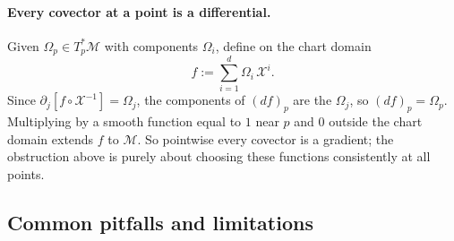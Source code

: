 \documentclass[11pt]{article}
\newcommand{\TpsM}{T_p^*\mathcal M}
\begin{document}
\paragraph{Every covector at a point is a differential.} Given $\Omega_p\in\TpsM$ with components $\Omega_i$, define on the chart domain
\[
f:=\sum_{i=1}^d\Omega_i\,\mathcal X^i.
\]
Since $\partial_j[f\circ\mathcal X^{-1}]=\Omega_j$, the components of $(df)_p$ are the $\Omega_j$, so $(df)_p=\Omega_p$. Multiplying by a smooth function equal to $1$ near $p$ and $0$ outside the chart domain extends $f$ to $\mathcal M$. So pointwise every covector is a gradient; the obstruction above is purely about choosing these functions consistently at all points.

\subsection*{Common pitfalls and limitations}
\end{document}
